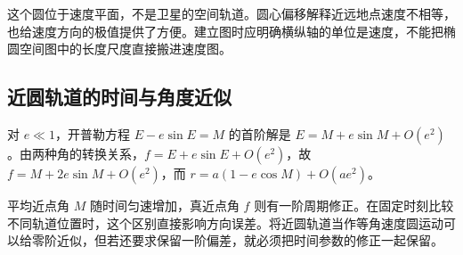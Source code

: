   这个圆位于速度平面，不是卫星的空间轨道。圆心偏移解释近远地点速度不相等，也给速度方向的极值提供了方便。建立图时应明确横纵轴的单位是速度，不能把椭圆空间图中的长度尺度直接搬进速度图。
  
\subsection{近圆轨道的时间与角度近似}

  对 $e\ll1$，开普勒方程 $E-e\sin E=M$ 的首阶解是 $E=M+e\sin M+O(e^2)$。由两种角的转换关系，$f=E+e\sin E+O(e^2)$，故 $f=M+2e\sin M+O(e^2)$，而 $r=a(1-e\cos M)+O(ae^2)$。

  平均近点角 $M$ 随时间匀速增加，真近点角 $f$ 则有一阶周期修正。在固定时刻比较不同轨道位置时，这个区别直接影响方向误差。将近圆轨道当作等角速度圆运动可以给零阶近似，但若还要求保留一阶偏差，就必须把时间参数的修正一起保留。
  

